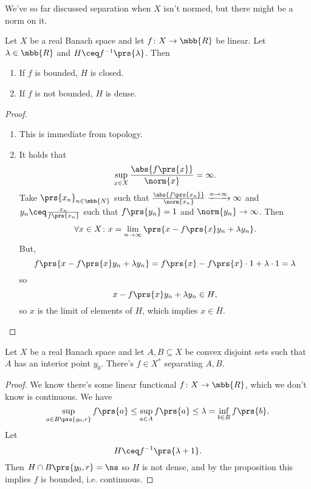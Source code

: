 \documentclass[10pt, twoside]{book}
\begin{document}
We've so far discussed separation when $X$ isn't normed, but there might be a norm on it.

\begin{proposition}
Let $X$ be a real Banach space and let $f \colon X \to \mbb{R}$ be linear. Let $\lambda \in \mbb{R}$ and $H \ceq f^{-1}\prs{\lambda}$. Then
\begin{enumerate}
\item If $f$ is bounded, $H$ is closed.
\item If $f$ is not bounded, $H$ is dense.
\end{enumerate}
\end{proposition}

\begin{proof}
\begin{enumerate}
\item This is immediate from topology.
\item It holds that
\begin{align*}
\sup_{x \in X} \frac{\abs{f\prs{x}}}{\norm{x}} = \infty \text{.}
\end{align*}
Take $\prs{x_n}_{n \in \mbb{N}}$ such that $\frac{\abs{f\prs{x_n}}}{\norm{x_n}} \xrightarrow{n\to\infty} \infty$ and $y_n \ceq \frac{x_n}{f\prs{x_n}}$ such that $f\prs{y_n} = 1$ and $\norm{y_n} \to \infty$.
Then
\begin{align*}
\forall x\in X \colon x = \lim_{n \to \infty} \prs{x - f\prs{x} y_n + \lambda y_n} \text{.}
\end{align*}
But,
\[f\prs{x - f\prs{x} y_n + \lambda y_n} = f\prs{x} - f\prs{x} \cdot 1 + \lambda \cdot 1 = \lambda\]
so
\[x - f\prs{x} y_n + \lambda y_n \in H \text{,}\]
so $x$ is the limit of elements of $H$, which implies $x \in \bar{H}$.
\end{enumerate}
\end{proof}

\begin{corollary}
Let $X$ be a real Banach space and let $A,B \subseteq X$ be convex disjoint sets such that $A$ has an interior point $y_0$.
There's $f \in X^*$ separating $A,B$.
\end{corollary}

\begin{proof}
We know there's some linear functional $f \colon X \to \mbb{R}$, which we don't know is continuous.
We have
\[\sup_{a \in B\prs{y_0, r}} f\prs{a} \leq \sup_{a \in A} f\prs{a} \leq \lambda = \inf_{b \in B} f\prs{b} \text{.}\]
Let
\[H \ceq f^{-1}\prs{\lambda + 1} \text{.}\]
Then $H \cap B\prs{y_0, r} = \ns$ so $H$ is not dense, and by the proposition this implies $f$ is bounded, i.e. continuous.
\end{proof}
\end{document}
